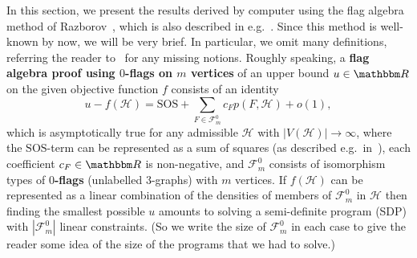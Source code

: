 \documentclass[11pt,a4paper]{article}
\newcommand{\xl}[1]{\textcolor{magenta}{XL: #1}}
\newcommand{\op}[1]{\textcolor{blue}{OP: #1}}
\newcommand{\lb}[1]{\textcolor{brown}{LB: #1}}
\theoremstyle{remark}
\newcommand{\C}[1]{\mathcal{#1}}
\newcommand{\I}[1]{{\mathbbm #1}}
\newcommand{\ra}[1]{\cite[#1]{Razborov10}}
\newcommand{\hide}[1]{}
\begin{document}
\hide{
%
\xl{added on 2024-10-21: I slightly modified and re-run Levente's no\_c5m file. The results I get are as follows:
\begin{itemize}
    \item I get $\alpha_{3.1} = \frac{27606157}{110100480} = 0.250736...$ with only the assumption that minimum degree is at least $\frac{1}{4}\binom{n}{2}$. 
    \item I get $\rho(F_{2,2,2}) \ge \beta = \frac{669843554483}{13762560000000} = 0.048671...$ with only the assumption that the edge density is at least $\frac{1}{4} - \frac{1}{10^6}$,
    \item These two values give $\alpha_{3.2} \ge \frac{\beta}{\alpha_{3.1}} = \frac{669843554483}{3450769625000} = 0.194114...$, which is still good enough for the step $B$ vs $M$. 
\end{itemize}}
\op{The constants still may change. My calculations (folder no\_C5\_files) show that we also do not need to use the min-degree assumption in Prop~\ref{pr:1}. The paper may look cleaner if we use as input the exact outputs from previous propositions, e.g. assuming in Proposition~\ref{pr:3} that the number of transversal edges is  at least exactly the value returned by Proposition~\ref{pr:2}, etc. I am not sure: this may result in final rational numbers having larger denominators. I can experiment with this once I am back, or someone else can try it.
}
\lb{I re-run all the calculations, the final file is here: https://github.com/bodnalev/supplementary_files/blob/main/no_c5m/no_c5m.ipynb
}
}

In this section, we present the results derived by computer using the flag algebra method of Razborov~\cite{Raz07}, which is also described in e.g.~\cite{Razborov10,BaberTalbot11,SFS16,GilboaGlebovHefetzLinialMorgenstein22}.
Since this method is well-known by now, we will be very brief. In particular,  we omit many definitions, referring
the reader to~\cite{Raz07,Razborov10} for any missing notions. Roughly speaking, a \textbf{flag algebra proof using $0$-flags on $m$ vertices} of an upper bound $u\in\I R$ on the given objective function $f$ 
consists of an identity 
$$
u-f(\C H)=\mathrm{SOS}+\sum_{F\in\C F_m^0}c_Fp(F,\C H)+o(1),
$$ 
which is asymptotically true for any admissible $\C H$ with $|V(\C H)|\to\infty$, where the $\mathrm{SOS}$-term can be represented as a sum of squares (as described e.g.\ in~\ra{Section~3}), each coefficient $c_F\in\I R$ is non-negative, and $\C F_m^0$ consists of isomorphism types of \textbf{$0$-flags} (unlabelled $3$-graphs) with $m$ vertices. If $f(\C H)$ can be represented as a linear combination of the densities of members of $\C F_m^0$ in $\C H$ then finding the smallest possible $u$ amounts to solving a semi-definite program (SDP) with $|\C F_m^0|$ linear constraints. (So we write the size of $\C F_m^0$ in each case to give the reader some idea of the size of the programs that we had to solve.)
\end{document}
